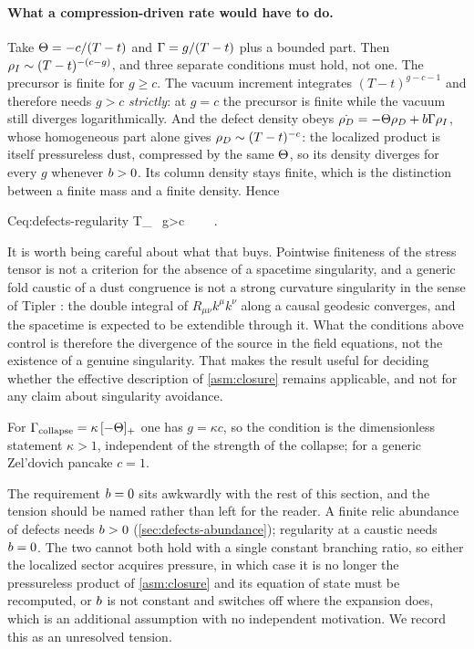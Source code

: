 \paragraph{What a compression-driven rate would have to do.} Take
$\Theta=-c/(T-t)$ and $\Gamma=g/(T-t)$ plus a bounded part. Then
$\rho_{I}\sim(T-t)^{-(c-g)}$, and three separate conditions must hold, not one.
The precursor is finite for $g\ge c$. The vacuum increment integrates
$(T-t)^{g-c-1}$ and therefore needs $g>c$ \emph{strictly}: at $g=c$ the
precursor is finite while the vacuum still diverges logarithmically. And the
defect density obeys $\dot{\rho_{D}}=-\Theta\rho_{D}+b\Gamma\rho_{I}$, whose homogeneous
part alone gives $\rho_{D}\sim(T-t)^{-c}$: the localized product is itself
pressureless dust, compressed by the same $\Theta$, so its density diverges for
every $g$ whenever $b>0$. Its column density stays finite, which is the
distinction between a finite mass and a finite density. Hence

\begin{keyresult}{C}{eq:defects-regularity}
  T_{\mu\nu}\ 
  \iff g>c\ \ \ \  .
\end{keyresult}

It is worth being careful about what that buys. Pointwise finiteness of the
stress tensor is not a criterion for the absence of a spacetime singularity,
and a generic fold caustic of a dust congruence is not a strong curvature
singularity in the sense of Tipler
\parencite{tipler1977_singularities,clarke1985_strongcurvature}: the double integral of
$R_{\mu\nu}k^\mu k^\nu$ along a causal geodesic converges, and the spacetime is
expected to be extendible through it. What the conditions above control is
therefore the divergence of the source in the field equations, not the
existence of a genuine singularity. That makes the result useful for deciding
whether the effective description of \cref{asm:closure} remains applicable, and
not for any claim about singularity avoidance.

For $\Gamma_{\rm collapse}=\kappa\,[-\Theta]_+$ one has $g=\kappa c$, so the
condition is the dimensionless statement $\kappa>1$, independent of the
strength of the collapse; for a generic Zel'dovich pancake $c=1$.

The requirement $b=0$ sits awkwardly with the rest of this section, and
the tension should be named rather than left for the reader. A finite relic
abundance of defects needs $b>0$
(\cref{sec:defects-abundance}); regularity at a caustic needs $b=0$. The
two cannot both hold with a single constant branching ratio, so either the
localized sector acquires pressure, in which case it is no longer the
pressureless product of \cref{asm:closure} and its equation of state must be
recomputed, or $b$ is not constant and switches off where the expansion
does, which is an additional assumption with no independent motivation. We
record this as an unresolved tension.

